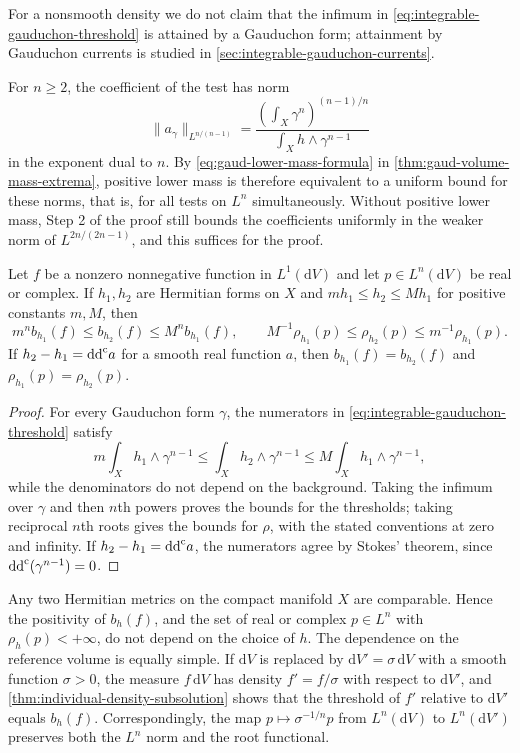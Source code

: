 For a nonsmooth density we do not claim that the infimum in \eqref{eq:integrable-gauduchon-threshold} is attained by a Gauduchon form; attainment by Gauduchon currents is studied in \cref{sec:integrable-gauduchon-currents}.

For $n\geq2$, the coefficient of the test has norm
\[
 \|a_\gamma\|_{L^{n/(n-1)}}
 =\frac{(\int_X\gamma^n)^{(n-1)/n}}
        {\int_Xh\wedge\gamma^{n-1}}
\]
in the exponent dual to $n$. By \eqref{eq:gaud-lower-mass-formula} in \cref{thm:gaud-volume-mass-extrema}, positive lower mass is therefore equivalent to a uniform bound for these norms, that is, for all tests on $L^n$ simultaneously. Without positive lower mass, Step 2 of the proof still bounds the coefficients uniformly in the weaker norm of $L^{2n/(2n-1)}$, and this suffices for the proof.

\begin{proposition}\label{prop:individual-threshold-backgrounds}
Let $f$ be a nonzero nonnegative function in $L^1(\mathrm{d}V)$ and let $p\in L^n(\mathrm{d}V)$ be real or complex. If $h_1,h_2$ are Hermitian forms on $X$ and $m h_1\leq h_2\leq M h_1$ for positive constants $m,M$, then
\[
 m^n b_{h_1}(f)\leq b_{h_2}(f)\leq M^n b_{h_1}(f),
 \qquad
 M^{-1}\rho_{h_1}(p)\leq\rho_{h_2}(p)\leq m^{-1}\rho_{h_1}(p).
\]
If $h_2-h_1=\mathrm{dd}^{\mathrm{c}} a$ for a smooth real function $a$, then $b_{h_1}(f)=b_{h_2}(f)$ and $\rho_{h_1}(p)=\rho_{h_2}(p)$.
\end{proposition}
\begin{proof}
For every Gauduchon form $\gamma$, the numerators in \eqref{eq:integrable-gauduchon-threshold} satisfy
\[
 m\int_Xh_1\wedge\gamma^{n-1}\leq\int_Xh_2\wedge\gamma^{n-1}
 \leq M\int_Xh_1\wedge\gamma^{n-1},
\]
while the denominators do not depend on the background. Taking the infimum over $\gamma$ and then $n$th powers proves the bounds for the thresholds; taking reciprocal $n$th roots gives the bounds for $\rho$, with the stated conventions at zero and infinity. If $h_2-h_1=\mathrm{dd}^{\mathrm{c}} a$, the numerators agree by Stokes' theorem, since $\mathrm{dd}^{\mathrm{c}}(\gamma^{n-1})=0$.
\end{proof}

Any two Hermitian metrics on the compact manifold $X$ are comparable. Hence the positivity of $b_h(f)$, and the set of real or complex $p\in L^n$ with $\rho_h(p)<+\infty$, do not depend on the choice of $h$. The dependence on the reference volume is equally simple. If $\mathrm{d}V$ is replaced by $\mathrm{d}V'=\sigma\,\mathrm{d}V$ with a smooth function $\sigma>0$, the measure $f\,\mathrm{d}V$ has density $f'=f/\sigma$ with respect to $\mathrm{d}V'$, and \cref{thm:individual-density-subsolution} shows that the threshold of $f'$ relative to $\mathrm{d}V'$ equals $b_h(f)$. Correspondingly, the map $p\mapsto\sigma^{-1/n}p$ from $L^n(\mathrm{d}V)$ to $L^n(\mathrm{d}V')$ preserves both the $L^n$ norm and the root functional.
